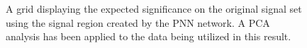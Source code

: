 \begin{figure}[H]
    \caption{A grid displaying the expected significance on the original signal set using the signal region 
    created by the \acs{PNN} network. A \acs{PCA} analysis has been applied to the data being utilized in this result.}
    \label{fig:PNNPCAGridSig}
\end{figure}

